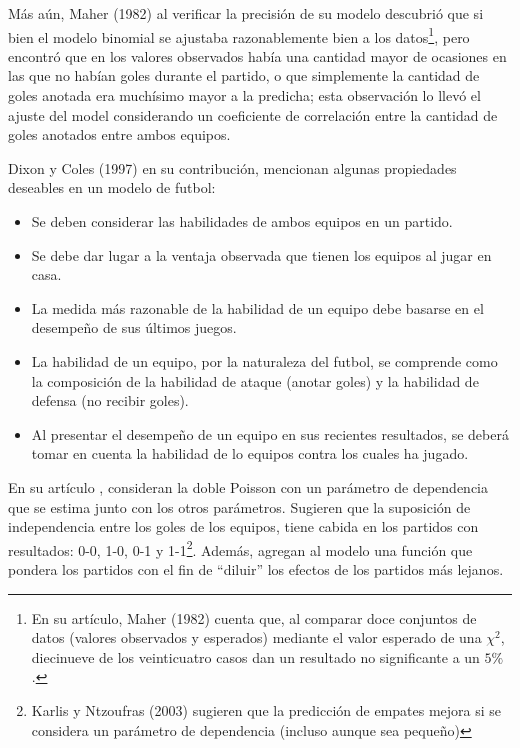 Más aún, Maher (1982) \cite{maher1982modelling} al verificar la precisión de su modelo descubrió que si bien el modelo binomial se ajustaba razonablemente bien a los datos\footnote{En su artículo, Maher (1982) \cite{maher1982modelling} cuenta que, al comparar doce conjuntos de datos (valores observados y esperados) mediante el valor esperado de una $\chi^2$, diecinueve de los veinticuatro casos dan un resultado no significante a un $5\%$.}, pero encontró que en los valores observados había una cantidad mayor de ocasiones en las que no habían goles durante el partido, o que simplemente la cantidad de goles anotada era muchísimo mayor a la predicha; esta observación lo llevó el ajuste del model considerando un coeficiente de correlación entre la cantidad de goles anotados entre ambos equipos.

Dixon y Coles (1997) \cite{dixon1997modelling} en su contribución, mencionan algunas propiedades deseables en un modelo de futbol:
\begin{itemize}
	\item Se deben considerar las habilidades de ambos equipos en un partido.
	\item Se debe dar lugar a la ventaja observada que tienen los equipos al jugar en casa.
	\item La medida más razonable de la habilidad de un equipo debe basarse en el desempeño de sus últimos juegos.
	\item La habilidad de un equipo, por la naturaleza del futbol, se comprende como la composición de la habilidad de ataque (anotar goles) y la habilidad de defensa (no recibir goles).
	\item Al presentar el desempeño de un equipo en sus recientes resultados, se deberá tomar en cuenta la habilidad de lo equipos contra los cuales ha jugado.
\end{itemize}

En su artículo \cite{dixon1997modelling}, consideran la doble Poisson con un parámetro de dependencia que se estima junto con los otros parámetros. Sugieren que la suposición de independencia entre los goles de los equipos, tiene cabida en los partidos con resultados: 0-0, 1-0, 0-1 y 1-1\footnote{Karlis y Ntzoufras (2003) \cite{karlis2003analysis} sugieren que la predicción de empates mejora si se considera un parámetro de dependencia (incluso aunque sea pequeño)}. Además, agregan al modelo una función que pondera los partidos con el fin de ``diluir'' los efectos de los partidos más lejanos. 

